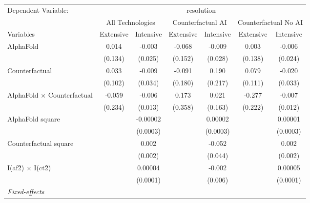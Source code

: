 \begingroup
\centering
\begin{tabular}{lcccccc}
   \tabularnewline \midrule \midrule
   Dependent Variable: & \multicolumn{6}{c}{resolution}\\
 & \multicolumn{2}{c}{All Technologies} & \multicolumn{2}{c}{Counterfactual AI} & \multicolumn{2}{c}{Counterfactual No AI} \\
\cmidrule(lr){1-1}\cmidrule(lr){2-3} \cmidrule(lr){4-5} \cmidrule(lr){6-7}
Variables & \multicolumn{1}{c}{Extensive} & \multicolumn{1}{c}{Intensive} & \multicolumn{1}{c}{Extensive} & \multicolumn{1}{c}{Intensive} & \multicolumn{1}{c}{Extensive} & \multicolumn{1}{c}{Intensive} \\
\cmidrule(lr){1-1}\cmidrule(lr){2-2} \cmidrule(lr){3-3} \cmidrule(lr){4-4} \cmidrule(lr){5-5} \cmidrule(lr){6-6} \cmidrule(lr){7-7}
   AlphaFold                          & 0.014   & -0.003   & -0.068  & -0.009   & 0.003   & -0.006\\   
                                      & (0.134) & (0.025)  & (0.152) & (0.028)  & (0.138) & (0.024)\\   
   Counterfactual                     & 0.033   & -0.009   & -0.091  & 0.190    & 0.079   & -0.020\\   
                                      & (0.102) & (0.034)  & (0.180) & (0.217)  & (0.111) & (0.033)\\   
   AlphaFold $\times$ Counterfactual  & -0.059  & -0.006   & 0.173   & 0.021    & -0.277  & -0.007\\   
                                      & (0.234) & (0.013)  & (0.358) & (0.163)  & (0.222) & (0.012)\\   
   AlphaFold square                   &         & -0.00002 &         & 0.00002  &         & 0.00001\\   
                                      &         & (0.0003) &         & (0.0003) &         & (0.0003)\\   
   Counterfactual square              &         & 0.002    &         & -0.052   &         & 0.002\\   
                                      &         & (0.002)  &         & (0.044)  &         & (0.002)\\   
   I(af\^2) $\times$ I(ct\^2)         &         & 0.00004  &         & -0.002   &         & 0.00005\\   
                                      &         & (0.0001) &         & (0.006)  &         & (0.0001)\\   
   \midrule
   \emph{Fixed-effects}\\

\end{tabular}
